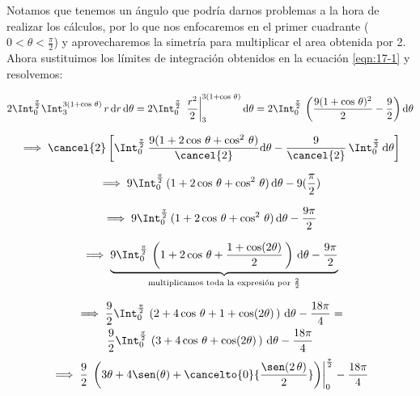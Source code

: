 \documentclass[12pt]{article}
\begin{document}
\noindent Notamos que tenemos un ángulo que podría darnos problemas a la hora de realizar los cálculos, por lo que nos enfocaremos en el primer cuadrante ($0<\theta<\frac{\pi}{2}$) y aprovecharemos la simetría para multiplicar el area obtenida por 2. Ahora sustituimos los límites de integración obtenidos en la ecuación \eqref{eqn:17-1} y resolvemos:

\begin{align*}
	2\Int_{0}^{\frac{\pi}{2}} \Int_{3}^{3(1+\cos\,\theta)}\, r\,\mathrm{d}r\,\mathrm{d}\theta = 2\Int_{0}^{\frac{\pi}{2}}\, \left.\frac{r^2}{2}\right|_{3}^{3(1+\cos\,\theta)} \mathrm{d}\theta = 2\Int_{0}^{\frac{\pi}{2}}\, \left(\frac{9(1+\cos\,\theta)^2}{2}  - \frac{9}{2}\right)  \mathrm{d}\theta
\end{align*}

\begin{align*}
	\implies \cancel{2}\left[ \Int_{0}^{\frac{\pi}{2}}\, \frac{9(1+2\cos\,\theta+\cos^2\,\theta)}{\cancel{2}} \mathrm{d}\theta  - \frac{9}{\cancel{2}}\, \Int_{0}^{\frac{\pi}{2}}\, \mathrm{d}\theta \right]
\end{align*}

\begin{align*}
	\implies 9\Int_{0}^{\frac{\pi}{2}}\, (1+2\cos\,\theta+\cos^2\,\theta)\, \mathrm{d}\theta  - 9 (\frac{\pi}{2})
\end{align*}

\begin{align*}
	\implies 9\Int_{0}^{\frac{\pi}{2}}\, (1+2\cos\,\theta+\cos^2\,\theta)\, \mathrm{d}\theta  - \frac{9\pi}{2}
\end{align*}

\begin{align*}
	\implies \underbrace{9\Int_{0}^{\frac{\pi}{2}}\, \left(1+2\cos\,\theta+\frac{1+\cos(2\theta)}{2}\,\right)\, \mathrm{d}\theta - \frac{9\pi}{2}}_{\text{multiplicamos toda la expresión por $\frac{2}{2}$}}
\end{align*}

\begin{multline*}
	\implies \frac{9}{2}\Int_{0}^{\frac{\pi}{2}}\, \left(2+4\cos\,\theta+1+\cos(2\theta)\,\right)\, \mathrm{d}\theta - \frac{18\pi}{4} =\\ \frac{9}{2}\Int_{0}^{\frac{\pi}{2}}\, \left(3+4\cos\,\theta+\cos(2\theta)\,\right)\, \mathrm{d}\theta - \frac{18\pi}{4}
\end{multline*}
\begin{align*}
	\implies \frac{9}{2}\,\left.\left(3\theta+4\sen(\theta)+\cancelto{0}{\frac{\sen(2\,\theta)}{2}}\right)\right|_{0}^{\frac{\pi}{2}} - \frac{18\pi}{4}
\end{align*}
\end{document}
